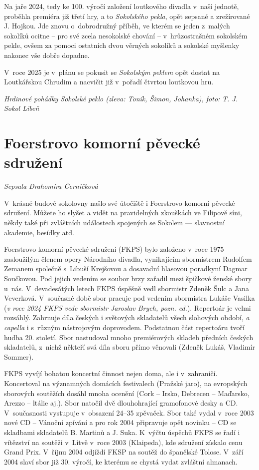 \documentclass[a5paper, 12pt, twoside]{article}
\begin{document}
Na jaře 2024, tedy ke 100. výročí založení loutkového divadla v~naší
jednotě, proběhla premiéra již třetí hry, a to \textit{Sokolského pekla},
opět sepsané a zrežírované J. Hojkou. Jde znovu o~dobrodružný příběh, ve
kterém se jeden z~malých sokolíků ocitne -- pro své zcela nesokolské
chování -- v~hrůzostrašném sokolském pekle, ovšem za pomoci ostatních
dvou věrných sokolíků a sokolské myšlenky nakonec vše dobře dopadne.

V~roce 2025 je v~plánu se pokusit se \textit{Sokolským peklem} opět dostat
na Loutkářskou Chrudim a nacvičit již v~pořadí čtvrtou loutkovou hru.


\textit{Hrdinové pohádky Sokolské peklo (zleva: Toník, Šimon, Johanka),
foto:} \textit{T. J. Sokol Libeň}

\section{Foerstrovo komorní pěvecké
sdružení}

\textit{Sepsala Drahomíra Černičková}

V~krásné budově sokolovny našlo své útočiště i Foerstrovo komorní
pěvecké sdružení. Můžete ho slyšet a vidět na pravidelných zkouškách ve
Filipově síni, někdy také při zvláštních událostech spojených se Sokolem
--- slavnostní akademie, besídky atd.

Foerstrovo komorní pěvecké sdružení (FKPS) bylo založeno v~roce 1975
zasloužilým členem opery Národního divadla, vynikajícím sbormistrem
Rudolfem Zemanem společně s~Libuší Krejšovou a dosavadní hlasovou
poradkyní Dagmar Součkovou. Pod jejich vedením se soubor brzy zařadil
mezi špičkové ženské sbory u~nás. V~devadesátých letech FKPS úspěšně
vedl sbormistr Zdeněk Šulc a Jana Veverková. V~současné době sbor
pracuje pod vedením sbormistra Lukáše Vasilka (\textit{v roce 2024 FKPS
vede sbormistr Jaroslav Brych, pozn. ed.}). Repertoár je velmi rozsáhlý.
Zahrnuje díla českých i světových skladatelů všech slohových období,
\textit{a capella} i s~různým nástrojovým doprovodem. Podstatnou část
repertoáru tvoří hudba 20. století. Sbor nastudoval mnoho premiérových
skladeb předních českých skladatelů, z~nichž někteří svá díla sboru
přímo věnovali (Zdeněk Lukáš, Vladimír Sommer).

FKPS vyvíjí bohatou koncertní činnost nejen doma, ale i v~zahraničí.
Koncertoval na významných domácích festivalech (Pražské jaro), na
evropských sborových soutěžích dosáhl mnoha ocenění (Cork -- Irsko,
Debrecen -- Maďarsko, Arezzo -- ltálie aj.). Sbor natočil dvě
dlouhohrající gramofonové desky a CD. V~současnosti vystupuje v~obsazení
24--35 zpěvaček. Sbor také vydal v~roce 2003 nové CD -- Vánoční zpívání
a pro rok 2004 připravuje opět novinku -- CD se skladbami skladatelů B.
Martinů a J. Suka. K~výčtu úspěchů FKPS se řadí i vítězství na soutěži
v~Litvě v~roce 2003 (Klaipeda), kde sdružení získalo cenu Grand Prix.
V~říjnu 2004 odjíždí FKSP na soutěž do španělské Tolose. V~září 2004 slaví
sbor již 30. výročí, ke kterému se chystá vydat zvláštní almanach.
\end{document}
